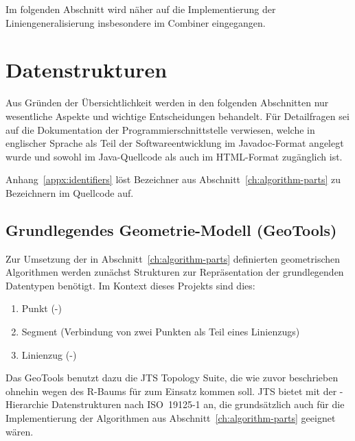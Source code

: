 \documentclass[../main/thesis.tex]{subfiles}
\begin{document}

Im folgenden Abschnitt wird näher auf die Implementierung der Liniengeneralisierung insbesondere im Combiner eingegangen.



\section{Datenstrukturen}
\label{ch:data-structures}


Aus Gründen der Übersichtlichkeit werden in den folgenden Abschnitten nur wesentliche Aspekte und wichtige Entscheidungen behandelt.
Für Detailfragen sei auf die Dokumentation der Programmierschnittstelle verwiesen, welche in englischer Sprache als Teil der Softwareentwicklung im Javadoc-Format angelegt wurde und sowohl im Java-Quellcode als auch im HTML-Format zugänglich ist.

Anhang~\ref{appx:identifiers} löst Bezeichner aus Abschnitt~\ref{ch:algorithm-parts} zu Bezeichnern im Quellcode auf.



\subsection{Grundlegendes Geometrie-Modell (GeoTools)}

Zur Umsetzung der in Abschnitt~\ref{ch:algorithm-parts} definierten geometrischen Algorithmen werden zunächst Strukturen zur Repräsentation der grundlegenden Datentypen benötigt.
Im Kontext dieses Projekts sind dies:
\begin{enumerate}[nosep]
	\item Punkt (\osm-)
	\item Segment (Verbindung von zwei Punkten als Teil eines Linienzugs)
	\item Linienzug (\osm-)
\end{enumerate}

\noindent
Das  GeoTools benutzt dazu die JTS Topology Suite, die wie zuvor beschrieben ohnehin wegen des R-Baums für  zum Einsatz kommen soll.
JTS bietet mit der -Hierarchie Datenstrukturen nach ISO~19125\hbox{-}1 an, die grundsätzlich auch für die Implementierung der Algorithmen aus Abschnitt~\ref{ch:algorithm-parts} geeignet wären.
\end{document}
